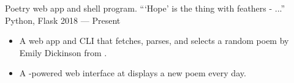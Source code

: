 \showoff
{}
{Poetry web app and shell program. ```Hope' is the thing with feathers - ...''}
{Python, Flask}
{2018 --- Present}

\begin{itemize}
    \item A web app and CLI that fetches, parses, and selects a random poem by Emily Dickinson from .
    \item A -powered web interface at  displays a new poem every day.
\end{itemize}
